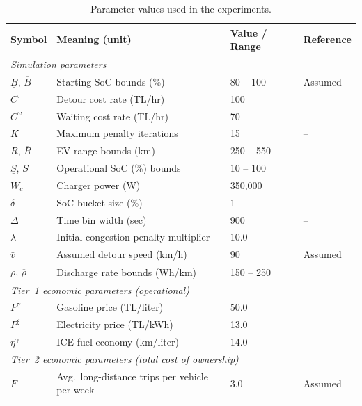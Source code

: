 \begin{table}[!htb]
\centering
\footnotesize
\caption{Parameter values used in the experiments.}\label{tab:params}
\begin{tabularx}{\textwidth}{l >{\raggedright\arraybackslash}X l >{\raggedright\arraybackslash}X}
\toprule
\textbf{Symbol} & \textbf{Meaning (unit)} & \textbf{Value / Range} & \textbf{Reference} \\
\midrule
\multicolumn{4}{l}{\textit{Simulation parameters}} \\
$\underline{B},\, \overline{B}$ & Starting SoC bounds (\%) & 80 -- 100 & Assumed \\
$C^\tau$ & Detour cost rate (TL/hr) & 100 & \cite{numbeo_turkey_2025} \\
$C^\omega$ & Waiting cost rate (TL/hr) & 70 & \cite{numbeo_turkey_2025} \\
$\overline{K}$ & Maximum penalty iterations & 15 & -- \\
$\underline{R},\, \overline{R}$ & EV range bounds (km) & 250 -- 550 & \cite{evdatabase_2025} \\
$\underline{S}$, $\overline{S}$ & Operational SoC (\%) bounds & 10 -- 100 & \cite{ev_battery_2022} \\
$W_c$ & Charger power (W) & 350,000 & \cite{zes_pricing_2025} \\
$\delta$ & SoC bucket size (\%) & 1 & -- \\
$\Delta$ & Time bin width (sec) & 900 & -- \\
$\lambda$ & Initial congestion penalty multiplier & 10.0 & -- \\
$\bar{v}$ & Assumed detour speed (km/h) & 90 & Assumed \\
$\underline{\rho},\, \overline{\rho}$ & Discharge rate bounds (Wh/km) & 150 -- 250 & \cite{evdatabase_2025} \\
\midrule
\multicolumn{4}{l}{\textit{Tier~1 economic parameters (operational)}} \\
$P^{\gamma}$ & Gasoline price (TL/liter) & 50.0 & \cite{epdk_gasoline_2025} \\
$P^{\xi}$ & Electricity price (TL/kWh) & 13.0 & \cite{zes_pricing_2025} \\
$\eta^{\gamma}$ & ICE fuel economy (km/liter) & 14.0 & \cite{iea_2024} \\
\midrule
\multicolumn{4}{l}{\textit{Tier~2 economic parameters (total cost of ownership)}} \\
$F$ & Avg.\ long-distance trips per vehicle per week & 3.0 & Assumed \\

\end{tabularx}
\end{table}
